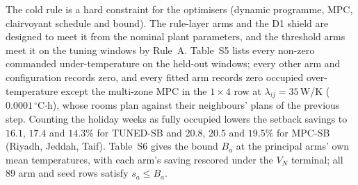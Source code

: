 \documentclass[11pt]{article}
\newcommand{\lij}{\lambda_{ij}}
\begin{document}
The cold rule is a hard constraint for the optimisers (dynamic programme, MPC, clairvoyant schedule and bound). The rule-layer arms and the D1 shield are designed to meet it from the nominal plant parameters, and the threshold arms meet it on the tuning windows by Rule~A. Table~S5 lists every non-zero commanded under-temperature on the held-out windows; every other arm and configuration records zero, and every fitted arm records zero occupied over-temperature except the multi-zone MPC in the $1\times4$ row at $\lij=35\,$W/K ($0.0001\,^\circ$C$\cdot$h), whose rooms plan against their neighbours' plans of the previous step. Counting the holiday weeks as fully occupied lowers the setback savings to $16.1$, $17.4$ and $14.3\%$ for TUNED-SB and $20.8$, $20.5$ and $19.5\%$ for MPC-SB (Riyadh, Jeddah, Taif). Table~S6 gives the bound $B_a$ at the principal arms' own mean temperatures, with each arm's saving rescored under the $V_N$ terminal; all $89$ arm and seed rows satisfy $s_a\le B_a$.
\end{document}
